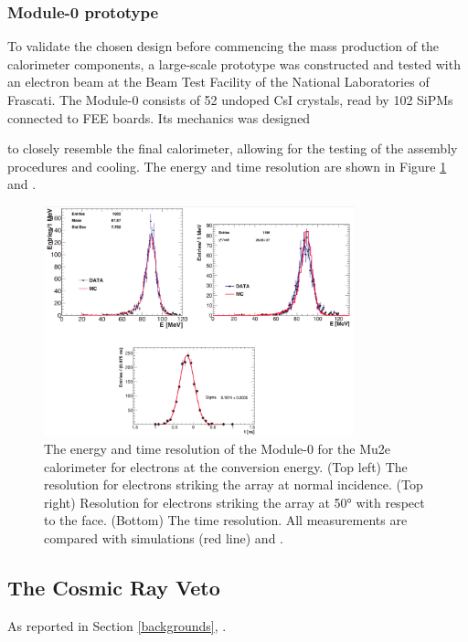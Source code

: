 \subsubsection{Module-0 prototype}
To validate the chosen design before commencing the mass production of 
the calorimeter components, a large-scale prototype was constructed and 
tested with an electron beam at the Beam Test Facility of the National 
Laboratories of Frascati. The Module-0 consists of 52 undoped CsI crystals, 
read by 102 SiPMs connected to FEE boards. Its mechanics was designed

to closely resemble the final calorimeter, allowing for the testing 
of the assembly procedures and cooling.
The energy and time resolution are
shown in Figure \ref{fig:calores} \cite{bobbb} and \cite{calo95}.
\begin{figure}[!h]
    \centering
    \includegraphics[width =0.8\textwidth]{figures/png/Screenshot_20240330_105520.png}
    \caption[The energy and time resolution of the calorimeter Module-0.]{The 
    energy and time resolution of the Module-0 for the Mu2e 
    calorimeter for electrons at the conversion energy. (Top left) The resolution 
    for electrons striking the array at normal incidence. (Top right) 
    Resolution for electrons striking the array at 50° with respect to the 
    face. (Bottom) The time resolution. All measurements are compared with 
    simulations (red line) \cite{bobbb} and \cite{calo95}.}
    \label{fig:calores}
\end{figure}
\subsection{The Cosmic Ray Veto}\label{CRV}
As reported in  Section \ref{backgrounds}, .

